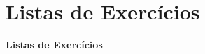 



\section[Listas de Exercícios]{Listas de Exercícios}\label{sec:listas}



{
  \begin{frame}[plain]%

    \vfill

    \centering{}
    \Huge{\textbf{Listas de Exercícios}}

    \vfill

  \end{frame}
} %



